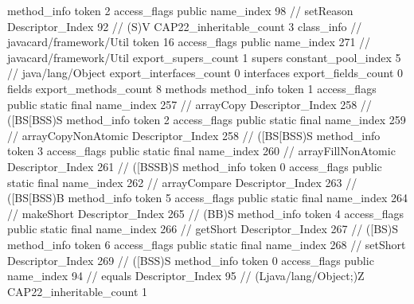 {{{{{				}
				method_info {
					token	2
					access_flags	public
					name_index	98		// setReason
					Descriptor_Index	92		// (S)V
				}
			}
			CAP22_inheritable_count	3
		}
		class_info {		// javacard/framework/Util
			token	16
			access_flags	public
			name_index	271		// javacard/framework/Util
			export_supers_count	1
			supers {
				constant_pool_index	5		// java/lang/Object
			}
			export_interfaces_count	0
			interfaces {
			}
			export_fields_count	0
			fields {
			}
			export_methods_count	8
			methods {
				method_info {
					token	1
					access_flags	public static final
					name_index	257		// arrayCopy
					Descriptor_Index	258		// ([BS[BSS)S
				}
				method_info {
					token	2
					access_flags	public static final
					name_index	259		// arrayCopyNonAtomic
					Descriptor_Index	258		// ([BS[BSS)S
				}
				method_info {
					token	3
					access_flags	public static final
					name_index	260		// arrayFillNonAtomic
					Descriptor_Index	261		// ([BSSB)S
				}
				method_info {
					token	0
					access_flags	public static final
					name_index	262		// arrayCompare
					Descriptor_Index	263		// ([BS[BSS)B
				}
				method_info {
					token	5
					access_flags	public static final
					name_index	264		// makeShort
					Descriptor_Index	265		// (BB)S
				}
				method_info {
					token	4
					access_flags	public static final
					name_index	266		// getShort
					Descriptor_Index	267		// ([BS)S
				}
				method_info {
					token	6
					access_flags	public static final
					name_index	268		// setShort
					Descriptor_Index	269		// ([BSS)S
				}
				method_info {
					token	0
					access_flags	public
					name_index	94		// equals
					Descriptor_Index	95		// (Ljava/lang/Object;)Z
				}
			}
			CAP22_inheritable_count	1
		}
	}
}
